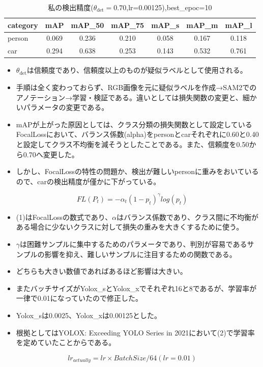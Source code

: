 \documentclass[a4j]{jarticle}
\begin{document}
	\begin{table}[htbp]
	\centering
	\caption{私の検出精度($\theta_{\mathrm{det}}=0.70$,lr=0.00125),best\_epoc=10}
		\begin{tabular}{lcccccc}
			\hline
			\textbf{category} & \textbf{mAP} & \textbf{mAP\_50} & \textbf{mAP\_75} & \textbf{mAP\_s} & \textbf{mAP\_m} & \textbf{mAP\_l} \\
			\hline
			person & 0.069 & 0.236 & 0.210 & 0.058 &0.167 & 0.118 \\
			car    & 0.294 & 0.638 & 0.253 & 0.143 & 0.532 & 0.761 \\
			\hline
		\end{tabular}
	\end{table}

	\begin{itemize}
		\item $\theta_{\mathrm{det}}$は信頼度であり、信頼度以上のものが疑似ラベルとして使用される。
		\item 手順は全く変わっておらず、RGB画像を元に疑似ラベルを作成→SAM2でのアノテーション→学習・検証である。違いとしては損失関数の変更と、細かいパラメータの変更である。
		\item mAPが上がった原因としては、クラス分類の損失関数として設定しているFocalLossにおいて、バランス係数(alpha)をpersonとcarそれぞれに0.60と0.40と設定してクラス不均衡を減そうとしたことである。また、信頼度を0.50から0.70へ変更した。
		\item しかし、FocalLossの特性の問題か、検出が難しいpersonに重みをおいているので、carの検出精度が僅かに下がっている。
	\end{itemize}
	\begin{equation}
		FL (P_t) = - \alpha _ t(1 - p_t)^ \gamma log(p_t)
	\end{equation}
	\begin{itemize}
		\item (1)はFocalLossの数式であり、$\alpha$はバランス係数であり、クラス間に不均衡がある場合に少ないクラスに対して損失の重みを大きくするために使う。\cite{FocalLoss}
		\item $\gamma$は困難サンプルに集中するためのパラメータであり、判別が容易であるサンプルの影響を抑え、難しいサンプルに注目するための関数である。
		\item どちらも大きい数値であればあるほど影響は大きい。
	\end{itemize}
		\begin{itemize}
		\item またバッチサイズがYolox\_sとYolox\_xでそれぞれ16と8であるが、学習率が一律で0.01になっていたので修正した。
		\item Yolox\_sは0.0025、Yolox\_xは0.00125とした。
		\item 根拠としてはYOLOX: Exceeding YOLO Series in 2021において(2)で学習率を定めていたことからである。\cite{learning_rate}
	\end{itemize}
	\begin{equation}
		lr_{actually} = lr × BatchSize / 64 (lr=0.01)
	\end{equation}
\end{document}
